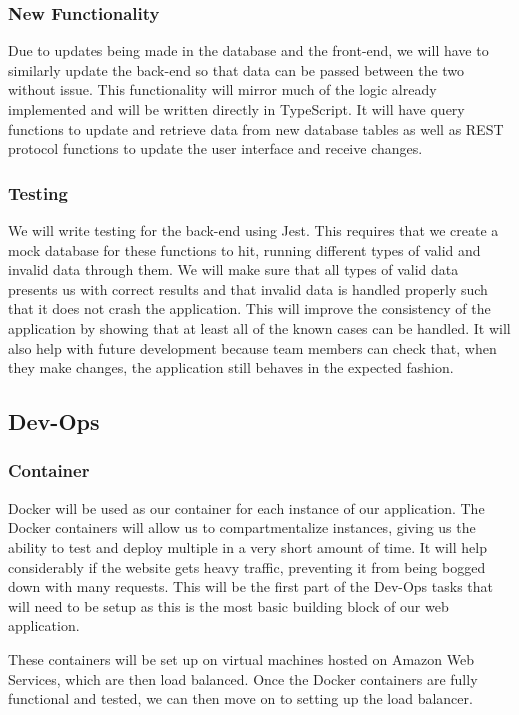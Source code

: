     \subsubsection{New Functionality}
        Due to updates being made in the database and the front-end, we will have to similarly update the back-end so that data can be passed between the two without issue. This functionality will mirror much of the logic already implemented and will be written directly in TypeScript. It will have query functions to update and retrieve data from new database tables as well as REST protocol functions to update the user interface and receive changes.
    \subsubsection{Testing}
        We will write testing for the back-end using Jest. This requires that we create a mock database for these functions to hit, running different types of valid and invalid data through them. We will make sure that all types of valid data presents us with correct results and that invalid data is handled properly such that it does not crash the application. This will improve the consistency of the application by showing that at least all of the known cases can be handled. It will also help with future development because team members can check that, when they make changes, the application still behaves in the expected fashion.
        
    \subsection{Dev-Ops}
        \subsubsection{Container}
            Docker will be used as our container for each instance of our application. The Docker containers will allow us to compartmentalize instances, giving us the ability to test and deploy multiple in a very short amount of time. It will help considerably if the website gets heavy traffic, preventing it from being bogged down with many requests. This will be the first part of the Dev-Ops tasks that will need to be setup as this is the most basic building block of our web application.
             
            These containers will be set up on virtual machines hosted on Amazon Web Services, which are then load balanced. Once the Docker containers are fully functional and tested, we can then move on to setting up the load balancer.
            
